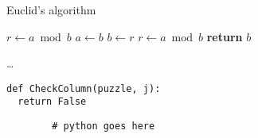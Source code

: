 \begin{algorithm}
  \caption{Euclid’s algorithm}
  \label{euclid}
  \begin{algorithmic}[1]
      \State $r\gets a\bmod b$
        \State $a\gets b$
        \State $b\gets r$
        \State $r\gets a\bmod b$
      \EndWhile
      \label{euclidendwhile}
      \State \textbf{return} $b$
    \EndFunction
  \end{algorithmic}
\end{algorithm}

\begin{algorithm}
  \begin{algorithmic}[0]
      \State \ldots\
    \EndFunction
  \end{algorithmic}
\end{algorithm}

\begin{listing}[h]
  \begin{verbatim}
def CheckColumn(puzzle, j):
  return False
  \end{verbatim}
\end{listing}

\begin{algorithm}
  \centering
  \begin{minipage}{0.50\textwidth}
  	\centering
  	\begin{algorithmic}[0]
  	\end{algorithmic}
  \end{minipage}\hfill
  \begin{minipage}{0.50\textwidth}
  	\centering
  	\begin{verbatim}
  		# python goes here
  	\end{verbatim}
  \end{minipage}
\end{algorithm}
